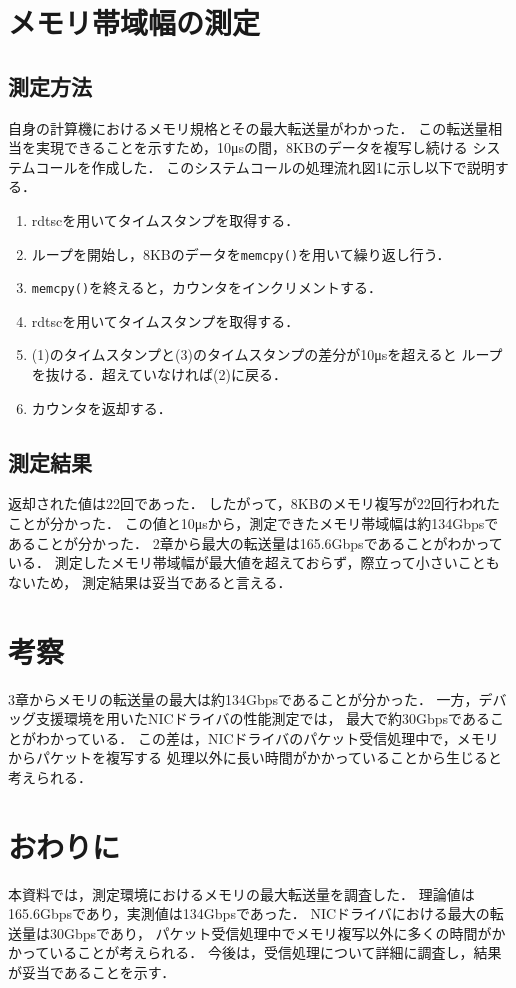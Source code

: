 \documentclass[12pt]{jsarticle}
\begin{document}
\section{メモリ帯域幅の測定}
\subsection{測定方法}
自身の計算機におけるメモリ規格とその最大転送量がわかった．
この転送量相当を実現できることを示すため，10μsの間，8KBのデータを複写し続ける
システムコールを作成した．
このシステムコールの処理流れ図1に示し以下で説明する．

\begin{enumerate}
    \item rdtscを用いてタイムスタンプを取得する．
    \item ループを開始し，8KBのデータを{\tt memcpy()}を用いて繰り返し行う．
    \item {\tt memcpy()}を終えると，カウンタをインクリメントする．
    \item rdtscを用いてタイムスタンプを取得する．
    \item (1)のタイムスタンプと(3)のタイムスタンプの差分が10μsを超えると
        ループを抜ける．超えていなければ(2)に戻る．
    \item カウンタを返却する．
\end{enumerate}

\subsection{測定結果}
返却された値は22回であった．
したがって，8KBのメモリ複写が22回行われたことが分かった．
この値と10μsから，測定できたメモリ帯域幅は約134Gbpsであることが分かった．
2章から最大の転送量は165.6Gbpsであることがわかっている．
測定したメモリ帯域幅が最大値を超えておらず，際立って小さいこともないため，
測定結果は妥当であると言える．

\section{考察}

3章からメモリの転送量の最大は約134Gbpsであることが分かった．
一方，デバッグ支援環境を用いたNICドライバの性能測定では，
最大で約30Gbpsであることがわかっている．
この差は，NICドライバのパケット受信処理中で，メモリからパケットを複写する
処理以外に長い時間がかかっていることから生じると考えられる．

\section{おわりに}

本資料では，測定環境におけるメモリの最大転送量を調査した．
理論値は165.6Gbpsであり，実測値は134Gbpsであった．
NICドライバにおける最大の転送量は30Gbpsであり，
パケット受信処理中でメモリ複写以外に多くの時間がかかっていることが考えられる．
今後は，受信処理について詳細に調査し，結果が妥当であることを示す．
\end{document}

